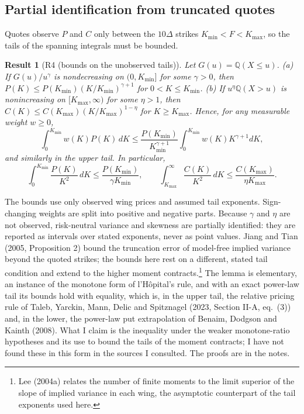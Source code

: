 \documentclass[11pt]{article}
\theoremstyle{result}
\newtheorem*{result}{Result}
\newcommand{\Q}{\mathbb{Q}}
\newcommand{\D}{\Delta}
\begin{document}
\subsection{Partial identification from truncated quotes}

Quotes observe $P$ and $C$ only between the $10\D$ strikes $K_{\min}<F<K_{\max}$, so the tails of the spanning integrals must be bounded.

\begin{result}[R4 (bounds on the unobserved tails)]
Let $G(u)=\Q(X\le u)$. (a) If $G(u)/u^\gamma$ is nondecreasing on $(0,K_{\min}]$ for some $\gamma>0$, then $P(K)\le P(K_{\min})(K/K_{\min})^{\gamma+1}$ for $0<K\le K_{\min}$. (b) If $u^\eta\Q(X>u)$ is nonincreasing on $[K_{\max},\infty)$ for some $\eta>1$, then $C(K)\le C(K_{\max})(K/K_{\max})^{1-\eta}$ for $K\ge K_{\max}$. Hence, for any measurable weight $w\ge0$,
\[
\int_0^{K_{\min}}w(K)P(K)\,dK\le\frac{P(K_{\min})}{K_{\min}^{\gamma+1}}\int_0^{K_{\min}}w(K)K^{\gamma+1}dK,
\]
and similarly in the upper tail. In particular,
\[
\int_0^{K_{\min}}\frac{P(K)}{K^2}\,dK\le\frac{P(K_{\min})}{\gamma K_{\min}},\qquad \int_{K_{\max}}^\infty\frac{C(K)}{K^2}\,dK\le\frac{C(K_{\max})}{\eta K_{\max}}.
\]
\end{result}

The bounds use only observed wing prices and assumed tail exponents. Sign-changing weights are split into positive and negative parts. Because $\gamma$ and $\eta$ are not observed, risk-neutral variance and skewness are partially identified: they are reported as intervals over stated exponents, never as point values. Jiang and Tian (2005, Proposition 2) bound the truncation error of model-free implied variance beyond the quoted strikes; the bounds here rest on a different, stated tail condition and extend to the higher moment contracts.\footnote{Lee (2004a) relates the number of finite moments to the limit superior of the slope of implied variance in each wing, the asymptotic counterpart of the tail exponents used here.} The lemma is elementary, an instance of the monotone form of l'H\^opital's rule, and with an exact power-law tail its bounds hold with equality, which is, in the upper tail, the relative pricing rule of Taleb, Yarckin, Mann, Delic and Spitznagel (2023, Section II-A, eq.~(3)) and, in the lower, the power-law put extrapolation of Benaim, Dodgson and Kainth (2008). What I claim is the inequality under the weaker monotone-ratio hypotheses and its use to bound the tails of the moment contracts; I have not found these in this form in the sources I consulted. The proofs are in the notes.
\end{document}
